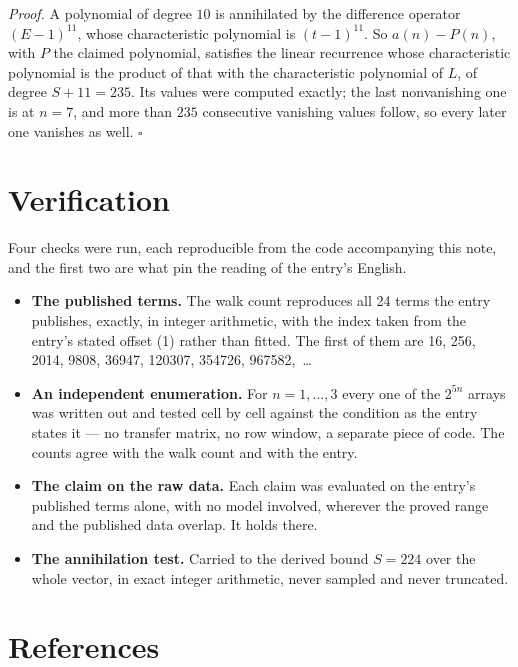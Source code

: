 \documentclass[11pt]{article}
\theoremstyle{definition}
\begin{document}
{\itshape Proof.} A polynomial of degree $10$ is annihilated by the difference operator $(E-1)^{11}$, whose characteristic polynomial is $(t-1)^{11}$. So $a(n) - P(n)$, with $P$ the claimed polynomial, satisfies the linear recurrence whose characteristic polynomial is the product of that with the characteristic polynomial of $L$, of degree $S + 11 = 235$. Its values were computed exactly; the last nonvanishing one is at $n = 7$, and more than $235$ consecutive vanishing values follow, so every later one vanishes as well. $\square$

\section{Verification}

Four checks were run, each reproducible from the code accompanying this note, and the first two are what pin the reading of the entry's English.

\begin{itemize}

\item {\bfseries The published terms.} The walk count reproduces all 24 terms the entry publishes, exactly, in integer arithmetic, with the index taken from the entry's stated offset (1) rather than fitted. The first of them are 16, 256, 2014, 9808, 36947, 120307, 354726, 967582,~\dots

\item {\bfseries An independent enumeration.} For $n = 1,\dots,3$ every one of the $2^{5n}$ arrays was written out and tested cell by cell against the condition as the entry states it --- no transfer matrix, no row window, a separate piece of code. The counts agree with the walk count and with the entry.

\item {\bfseries The claim on the raw data.} Each claim was evaluated on the entry's published terms alone, with no model involved, wherever the proved range and the published data overlap. It holds there.

\item {\bfseries The annihilation test.} Carried to the derived bound $S = 224$ over the whole vector, in exact integer arithmetic, never sampled and never truncated.

\end{itemize}

\section{References}
\end{document}
